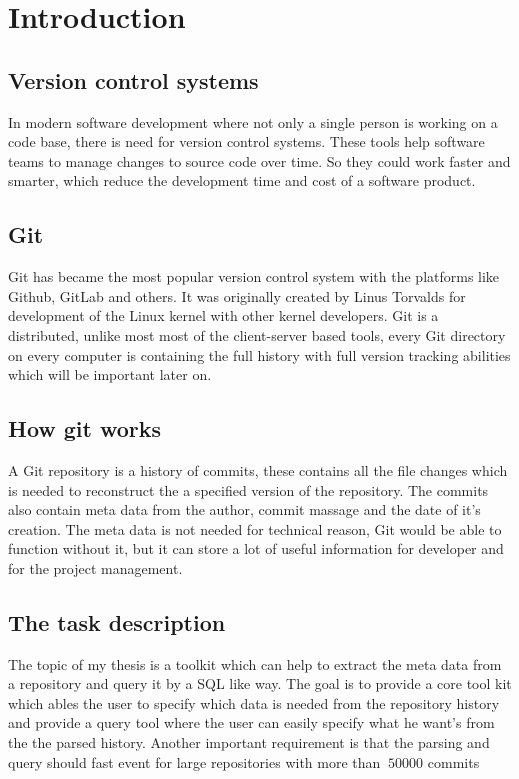 \chapter{Introduction}
\label{ch:intro}

\section{Version control systems}
In modern software development where not only a single person is working on a code base, there is need for version control systems. These tools help software teams to manage changes to source code over time. So they could work faster and smarter, which reduce the development time and cost of a software product.

\section{Git}
Git has became the most popular version control system with the platforms like Github\cite{Github}, GitLab\cite{Gitlab} and others. It was originally created by Linus Torvalds \cite{linus} for development of the Linux kernel with other kernel developers. Git is a distributed, unlike most most of the client-server based tools, every Git directory on every computer is containing the full history with full version tracking abilities which will be important later on.

\section{How git works}
A Git repository is a history of commits, these contains all the file changes which is needed to reconstruct the a specified version of the repository. The commits also contain meta data from the author, commit massage and the date of it's creation.
The meta data is not needed for technical reason, Git would be able to function without it, but it can store a lot of useful information for developer and for the project management.

\section{The task description}
The topic of my thesis is a toolkit which can help to extract the meta data from a repository and query it by a SQL like way. The goal is to provide a core tool kit which ables the user to specify which data is needed from the repository history and provide a query tool where the user can easily specify what he want's from the the parsed history. Another important requirement is that the parsing and query should fast event for large repositories with more than \(~50000\) commits  

